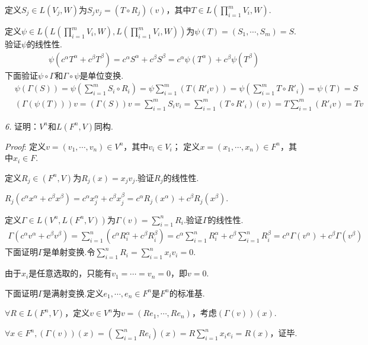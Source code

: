 定义\(S_j \in L(V_j,W)\)为\(S_jv_j=(T \circ R_j)(v)\)，其中\(T \in L(\prod_{i=1}^m V_i,W)\).

定义\(\psi \in L(L(\prod_{i=1}^m V_i,W),L(\prod_{i=1}^m V_i,W))\)为\(\psi(T)=(S_1,\cdots,S_m)=S\).验证\(\psi\)的线性性.
    \begin{align*}
        \psi(c^\alpha T^\alpha+c^\beta T^\beta)=c^\alpha S^\alpha+c^\beta S^\beta
        =c^\alpha \psi(T^\alpha)+c^\beta \psi(T^\beta)
    \end{align*}
下面验证\(\psi \circ \Gamma\)和\(\Gamma \circ \psi\)是单位变换.
    \begin{align*}
        &\psi(\Gamma(S))=\psi(\sum_{i=1}^m S_i \circ R_i)=\psi \sum_{i=1}^m (T(R'_iv))
        =\psi(\sum_{i=1}^m T \circ R'_i)=\psi(T)=S \\
        &(\Gamma(\psi(T)))v=(\Gamma(S))v=\sum_{i=1}^m S_iv_i
        =\sum_{i=1}^m (T \circ R'_i)(v)=T\sum_{i=1}^m (R'_iv)=Tv
    \end{align*}

\newpage

\textit{6.}
证明：\(V^n\)和\(L(F^n,V)\)同构.

\textit{Proof}:
定义\(v=(v_1,\cdots,v_n) \in V^n\)，其中\(v_i \in V_i\)；
定义\(x=(x_1,\cdots,x_n) \in F^n\)，其中\(x_i \in F\).

定义\(R_j \in (F^n,V)\)为\(R_j(x)=x_jv_j\).验证\(R_j\)的线性性.

$R_j(c^\alpha x^\alpha+c^\beta x^\beta)=c^\alpha x_j^\alpha+c^\beta x_j^\beta
=c^\alpha R_j(x^\alpha)+c^\beta R_j(x^\beta)$.

定义\(\Gamma \in L(V^n,L(F^n,V))\)为\(\Gamma(v)=\sum_{i=1}^n R_i\).验证\(\Gamma\)的线性性.
    \begin{align*}
        \Gamma(c^\alpha v^\alpha+c^\beta v^\beta)
        =\sum_{i=1}^n (c^\alpha R_i^\alpha+c^\beta R_i^\beta)
        =c^\alpha \sum_{i=1}^n R_i^\alpha+c^\beta \sum_{i=1}^n R_i^\beta
        =c^\alpha \Gamma(v^\alpha)+c^\beta \Gamma(v^\beta)
    \end{align*}
下面证明\(\Gamma\)是单射变换.令\(\sum_{i=1}^n R_i=\sum_{i=1}^n x_iv_i=0\).

由于\(x_i\)是任意选取的，只能有\(v_1=\cdots=v_n=0\)，即\(v=0\).

下面证明\(\Gamma\)是满射变换.定义\(e_1,\cdots,e_n \in F^n\)是\(F^n\)的标准基.

\(\forall R \in L(F^n,V)\)，定义\(v \in V^n\)为\(v=(Re_1,\cdots,Re_n)\)，考虑\((\Gamma(v))(x)\).

\(\forall x \in F^n,(\Gamma(v))(x)=(\sum_{i=1}^n Re_i)(x)=R\sum_{i=1}^n x_ie_i=R(x)\)，证毕.

